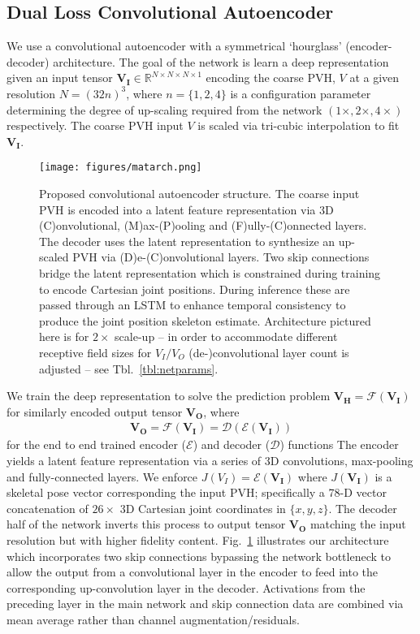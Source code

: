 \documentclass[runningheads]{llncs}
\begin{document}
\subsection {Dual Loss Convolutional Autoencoder}
\label{sec:autoenc}

We use a convolutional autoencoder with a symmetrical `hourglass' (encoder-decoder) architecture.  The goal of the network is learn a deep representation given an input tensor $\mathbf{V_I} \in \mathbb{R}^{N \times N \times N \times 1}$ encoding the coarse PVH, $V$ at a given resolution $N=(32n)^3$, where $n=\{1,2,4\}$ is a configuration parameter determining the degree of up-scaling required from the network $(1\times,2\times,4\times)$ respectively.  The coarse PVH input $V$ is scaled via tri-cubic interpolation to fit $\mathbf{V_I}$.
\begin{figure}[t!]
\centering
\texttt{[image: figures/matarch.png]}
\caption{Proposed convolutional autoencoder structure. The coarse input PVH is encoded into a latent feature representation via 3D (C)onvolutional, (M)ax-(P)ooling and (F)ully-(C)onnected layers.  The decoder uses the latent representation to synthesize an up-scaled PVH via (D)e-(C)onvolutional layers.  Two skip connections bridge the latent representation which is constrained during training to encode Cartesian joint positions. During inference these are passed through an LSTM to enhance temporal consistency to produce the joint position skeleton estimate.  Architecture pictured here is for $2\times$ scale-up -- in order to accommodate different receptive field sizes for $V_I/V_O$ (de-)convolutional layer count is adjusted -- see Tbl.~\ref{tbl:netparams}.
}
\label{fig:netarch}
\squeezeup
\end{figure}
We train the deep representation to solve the prediction problem $\mathbf{V_H} = \mathcal{F}(\mathbf{V_I})$ for similarly encoded output tensor $\mathbf{V_O}$, where 
\begin{eqnarray}
\mathbf{V_O} = \mathcal{F}(\mathbf{V_I})=\mathcal{D}(\mathcal{E}(\mathbf{V_I})) 
\end{eqnarray}
for the end to end trained encoder ($\mathcal{E}$) and decoder ($\mathcal{D}$) functions  The encoder yields a latent feature representation via a series of 3D convolutions, max-pooling and fully-connected layers.  We enforce $J(V_I)=\mathcal{E}(\mathbf{V_I})$ where $J(\mathbf{V_I})$ is a skeletal pose vector corresponding the input PVH; specifically a 78-D vector concatenation of $26\times$ 3D Cartesian joint coordinates in $\{x,y,z\}$.  The decoder half of the network inverts this process to output tensor $\mathbf{V_O}$ matching the input resolution but with higher fidelity content.
Fig.~\ref{fig:netarch} illustrates our architecture which incorporates two skip connections bypassing the network bottleneck to allow the output from a convolutional layer in the encoder to feed into the corresponding up-convolution layer in the decoder. Activations from the preceding layer in the main network and skip connection data are combined via mean average rather than channel augmentation/residuals. 
\end{document}

